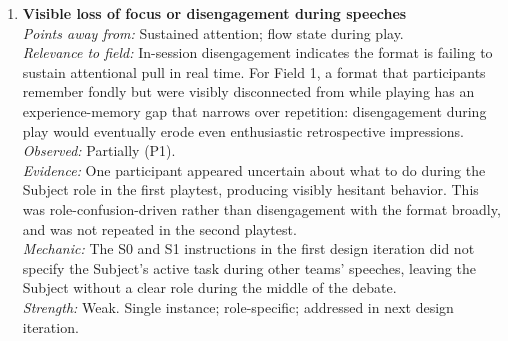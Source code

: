 \documentclass[12pt]{article}
\begin{document}
\begin{enumerate}
\item \textbf{Visible loss of focus or disengagement during speeches}\\
\textit{Points away from:} Sustained attention; flow state during play.\\
\textit{Relevance to field:} In-session disengagement indicates the format is failing to sustain attentional pull in real time. For Field 1, a format that participants remember fondly but were visibly disconnected from while playing has an experience-memory gap that narrows over repetition: disengagement during play would eventually erode even enthusiastic retrospective impressions.\\
\textit{Observed:} Partially (P1).\\
\textit{Evidence:} One participant appeared uncertain about what to do during the Subject role in the first playtest, producing visibly hesitant behavior. This was role-confusion-driven rather than disengagement with the format broadly, and was not repeated in the second playtest.\\
\textit{Mechanic:} The S0 and S1 instructions in the first design iteration did not specify the Subject's active task during other teams' speeches, leaving the Subject without a clear role during the middle of the debate.\\
\textit{Strength:} Weak. Single instance; role-specific; addressed in next design iteration.


\end{enumerate}
\end{document}
